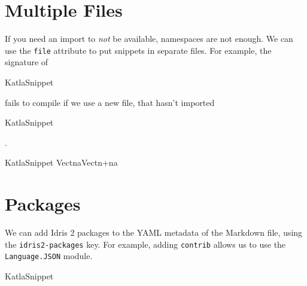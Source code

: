 \hypertarget{multiple-files}{%
\section{Multiple Files}\label{multiple-files}}

If you need an import to \emph{not} be available, namespaces are not
enough. We can use the \texttt{file} attribute to put snippets in
separate files. For example, the signature of
\let\KatlaSnippet\relax{}\newcommand\KatlaSnippet[1][]{\UseVerb[#1]{KatlaSnippet}}
\begin{SaveVerbatim}[commandchars=\\\{\}]{KatlaSnippet}
\KatlaNewline{}
\end{SaveVerbatim}
\KatlaSnippet{} fails to compile if we use a new file, that hasn't
imported
\let\KatlaSnippet\relax{}\newcommand\KatlaSnippet[1][]{\UseVerb[#1]{KatlaSnippet}}
\begin{SaveVerbatim}[commandchars=\\\{\}]{KatlaSnippet}
\KatlaNewline{}
\end{SaveVerbatim}
\KatlaSnippet{}.

\let\KatlaSnippet\relax{}\newcommand\KatlaSnippet[1][]{\BUseVerbatim[#1]{KatlaSnippet}}
\begin{SaveVerbatim}[commandchars=\\\{\}]{KatlaSnippet}
\KatlaSpace{}\KatlaNewline{}
\KatlaSpace{}\KatlaSpace{}\KatlaSpace{}\KatlaSpace{}\KatlaSpace{}\IdrisKeyword{:}\KatlaSpace{}Vect\KatlaSpace{}n\KatlaSpace{}a\KatlaSpace{}\IdrisKeyword{\KatlaDash{}>}\KatlaSpace{}Vect\KatlaSpace{}\IdrisKeyword{(}n\KatlaSpace{}+\KatlaSpace{}n\IdrisKeyword{)}\KatlaSpace{}a\KatlaNewline{}
\end{SaveVerbatim}
\KatlaSnippet{}

\hypertarget{packages}{%
\section{Packages}\label{packages}}

We can add Idris 2 packages to the YAML metadata of the Markdown file,
using the \texttt{idris2-packages} key. For example, adding
\texttt{contrib} allows us to use the \texttt{Language.JSON} module.

\let\KatlaSnippet\relax{}\newcommand\KatlaSnippet[1][]{\BUseVerbatim[#1]{KatlaSnippet}}
\begin{SaveVerbatim}[commandchars=\\\{\}]{KatlaSnippet}
\KatlaSpace{}\KatlaNewline{}
\KatlaNewline{}
\KatlaSpace{}\IdrisKeyword{:}\KatlaSpace{}\KatlaSpace{}\KatlaNewline{}
\KatlaSpace{}\IdrisKeyword{=}\KatlaSpace{}\KatlaSpace{}\KatlaNewline{}
\end{SaveVerbatim}
\KatlaSnippet{}
